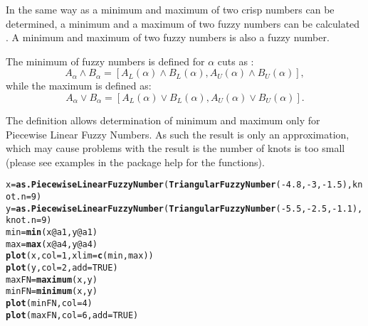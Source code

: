 \documentclass[11pt]{article}\usepackage[]{graphicx}\usepackage[]{color}
\makeatletter
\newcommand{\hlnum}[1]{\textcolor[rgb]{0.686,0.059,0.569}{#1}}%
\newcommand{\hlopt}[1]{\textcolor[rgb]{0,0,0}{#1}}%
\newcommand{\hlstd}[1]{\textcolor[rgb]{0.345,0.345,0.345}{#1}}%
\newcommand{\hlkwb}[1]{\textcolor[rgb]{0.69,0.353,0.396}{#1}}%
\newcommand{\hlkwc}[1]{\textcolor[rgb]{0.333,0.667,0.333}{#1}}%
\newcommand{\hlkwd}[1]{\textcolor[rgb]{0.737,0.353,0.396}{\textbf{#1}}}%
\newenvironment{kframe}{%
 \def\at@end@of@kframe{}%
 \ifinner\ifhmode%
  \def\at@end@of@kframe{\end{minipage}}%
  \begin{minipage}{\columnwidth}%
 \fi\fi%
 \def\FrameCommand##1{\hskip\@totalleftmargin \hskip-\fboxsep
 \colorbox{shadecolor}{##1}\hskip-\fboxsep
     \hskip-\linewidth \hskip-\@totalleftmargin \hskip\columnwidth}%
 \MakeFramed {\advance\hsize-\width
   \@totalleftmargin\z@ \linewidth\hsize
   \@setminipage}}%
 {\par\unskip\endMakeFramed%
 \at@end@of@kframe}
\newenvironment{knitrout}{}{} %
\makeatother
\begin{document}
In the same way as a minimum and maximum of two crisp numbers can be determined, a minimum and a maximum of two fuzzy numbers can be calculated \cite{KaufmannGupta1985:fuzzybook}. A minimum and maximum of two fuzzy numbers is also a fuzzy number. 

The minimum of fuzzy numbers is defined for $\alpha$ cuts as \cite{KaufmannGupta1985:fuzzybook}: 
\begin{equation}
A_\alpha \wedge B_\alpha = [A_L(\alpha) \wedge B_L(\alpha), A_U(\alpha) \wedge B_U(\alpha)],
\end{equation} 
while the maximum is defined as:
\begin{equation}
A_\alpha \vee B_\alpha = [A_L(\alpha) \vee B_L(\alpha), A_U(\alpha) \vee B_U(\alpha)].
\end{equation} 


The definition allows determination of minimum and maximum only for Piecewise Linear Fuzzy Numbers. As such the result is only an approximation, which may cause problems with the result is the number of knots is too small (please see examples in the package help for the functions).

\begin{knitrout}\small
{}\color{fgcolor}\begin{kframe}
\begin{alltt}
\hlstd{x} \hlkwb{=} \hlkwd{as.PiecewiseLinearFuzzyNumber}\hlstd{(}\hlkwd{TriangularFuzzyNumber}\hlstd{(}\hlopt{-}\hlnum{4.8}\hlstd{,} \hlopt{-}\hlnum{3} \hlstd{,} \hlopt{-}\hlnum{1.5}\hlstd{),} \hlkwc{knot.n} \hlstd{=} \hlnum{9}\hlstd{)}
\hlstd{y} \hlkwb{=} \hlkwd{as.PiecewiseLinearFuzzyNumber}\hlstd{(}\hlkwd{TriangularFuzzyNumber}\hlstd{(}\hlopt{-}\hlnum{5.5}\hlstd{,} \hlopt{-}\hlnum{2.5}\hlstd{,} \hlopt{-}\hlnum{1.1}\hlstd{),} \hlkwc{knot.n} \hlstd{=} \hlnum{9}\hlstd{)}
\hlstd{min} \hlkwb{=} \hlkwd{min}\hlstd{(x}\hlopt{@}\hlkwc{a1}\hlstd{,y}\hlopt{@}\hlkwc{a1}\hlstd{)}
\hlstd{max} \hlkwb{=} \hlkwd{max}\hlstd{(x}\hlopt{@}\hlkwc{a4}\hlstd{,y}\hlopt{@}\hlkwc{a4}\hlstd{)}
\hlkwd{plot}\hlstd{(x,} \hlkwc{col}\hlstd{=}\hlnum{1}\hlstd{,} \hlkwc{xlim} \hlstd{=} \hlkwd{c}\hlstd{(min,max))}
\hlkwd{plot}\hlstd{(y,} \hlkwc{col}\hlstd{=}\hlnum{2}\hlstd{,} \hlkwc{add}\hlstd{=}\hlnum{TRUE}\hlstd{)}
\hlstd{maxFN} \hlkwb{=} \hlkwd{maximum}\hlstd{(x,y)}
\hlstd{minFN} \hlkwb{=} \hlkwd{minimum}\hlstd{(x,y)}
\hlkwd{plot}\hlstd{(minFN,} \hlkwc{col}\hlstd{=}\hlnum{4}\hlstd{)}
\hlkwd{plot}\hlstd{(maxFN,} \hlkwc{col}\hlstd{=}\hlnum{6}\hlstd{,} \hlkwc{add}\hlstd{=}\hlnum{TRUE}\hlstd{)}
\end{alltt}
\end{kframe}
\end{knitrout}
\end{document}
